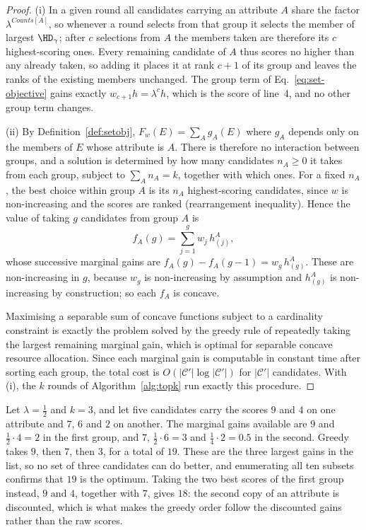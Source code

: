 \begin{proof}
(i) In a given round all candidates carrying an attribute $A$ share the factor $\lambda^{Counts[A]}$, so whenever a round selects from that group it selects the member of largest $\HD_\gamma$; after $c$ selections from $A$ the members taken are therefore its $c$ highest-scoring ones.
Every remaining candidate of $A$ thus scores no higher than any already taken, so adding it places it at rank $c+1$ of its group and leaves the ranks of the existing members unchanged.
The group term of Eq.~\eqref{eq:set-objective} gains exactly $w_{c+1}h=\lambda^{c}h$, which is the score of line~4, and no other group term changes.

(ii) By Definition~\ref{def:setobj}, $F_w(E)=\sum_A g_A(E)$ where $g_A$ depends only on the members of $E$ whose attribute is $A$.
There is therefore no interaction between groups, and a solution is determined by how many candidates $n_A\ge0$ it takes from each group, subject to $\sum_A n_A=k$, together with which ones.
For a fixed $n_A$, the best choice within group $A$ is its $n_A$ highest-scoring candidates, since $w$ is non-increasing and the scores are ranked (rearrangement inequality).
Hence the value of taking $g$ candidates from group $A$ is
\[
f_A(g)=\sum_{j=1}^{g} w_j\, h^A_{(j)},
\]
whose successive marginal gains are $f_A(g)-f_A(g-1)=w_g\,h^A_{(g)}$.
These are non-increasing in $g$, because $w_g$ is non-increasing by assumption and $h^A_{(g)}$ is non-increasing by construction; so each $f_A$ is concave.

Maximising a separable sum of concave functions subject to a cardinality constraint is exactly the problem solved by the greedy rule of repeatedly taking the largest remaining marginal gain, which is optimal for separable concave resource allocation.
Since each marginal gain is computable in constant time after sorting each group, the total cost is $O(|\mathcal{C}'|\log|\mathcal{C}'|)$ for $|\mathcal{C}'|$ candidates.
With (i), the $k$ rounds of Algorithm~\ref{alg:topk} run exactly this procedure.
\end{proof}



\begin{example}
\label{ex:greedy}
Let $\lambda=\tfrac12$ and $k=3$, and let five candidates carry the scores $9$ and $4$ on one attribute and $7$, $6$ and $2$ on another.
The marginal gains available are $9$ and $\tfrac12\cdot4=2$ in the first group, and $7$, $\tfrac12\cdot6=3$ and $\tfrac14\cdot2=0.5$ in the second.
Greedy takes $9$, then $7$, then $3$, for a total of $19$.
These are the three largest gains in the list, so no set of three candidates can do better, and enumerating all ten subsets confirms that $19$ is the optimum.
Taking the two best scores of the first group instead, $9$ and $4$, together with $7$, gives $18$: the second copy of an attribute is discounted, which is what makes the greedy order follow the discounted gains rather than the raw scores.
\end{example}
